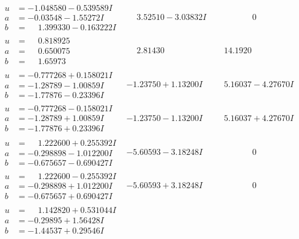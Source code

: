 \documentclass[1p]{elsarticle_modified}
\theoremstyle{definition}
\begin{document}
$$\begin{array}{c|c|c}
\begin{aligned}
u &= -1.048580 - 0.539589 I \\
a &= -0.03548 - 1.55272 I \\
b &= \phantom{-}1.399330 - 0.163222 I\end{aligned}
 & \phantom{-}3.52510 - 3.03832 I & \phantom{-0.000000 } 0 \\ \hline\begin{aligned}
u &= \phantom{-}0.818925\phantom{ +0.000000I} \\
a &= \phantom{-}0.650075\phantom{ +0.000000I} \\
b &= \phantom{-}1.65973\phantom{ +0.000000I}\end{aligned}
 & \phantom{-}2.81430\phantom{ +0.000000I} & \phantom{-}14.1920\phantom{ +0.000000I} \\ \hline\begin{aligned}
u &= -0.777268 + 0.158021 I \\
a &= -1.28789 - 1.00859 I \\
b &= -1.77876 - 0.23396 I\end{aligned}
 & -1.23750 + 1.13200 I & \phantom{-}5.16037 - 4.27670 I \\ \hline\begin{aligned}
u &= -0.777268 - 0.158021 I \\
a &= -1.28789 + 1.00859 I \\
b &= -1.77876 + 0.23396 I\end{aligned}
 & -1.23750 - 1.13200 I & \phantom{-}5.16037 + 4.27670 I \\ \hline\begin{aligned}
u &= \phantom{-}1.222600 + 0.255392 I \\
a &= -0.298898 - 1.012200 I \\
b &= -0.675657 - 0.690427 I\end{aligned}
 & -5.60593 - 3.18248 I & \phantom{-0.000000 } 0 \\ \hline\begin{aligned}
u &= \phantom{-}1.222600 - 0.255392 I \\
a &= -0.298898 + 1.012200 I \\
b &= -0.675657 + 0.690427 I\end{aligned}
 & -5.60593 + 3.18248 I & \phantom{-0.000000 } 0 \\ \hline\begin{aligned}
u &= \phantom{-}1.142820 + 0.531044 I \\
a &= -0.29895 + 1.56428 I \\
b &= -1.44537 + 0.29546 I\end{aligned}

\end{array}$$
\end{document}
